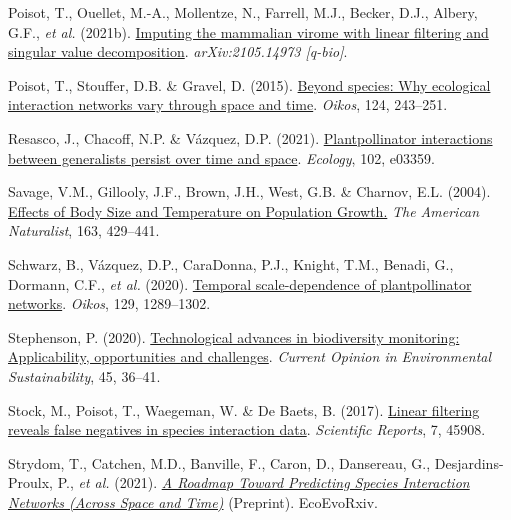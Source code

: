 \documentclass[10pt,oneside]{article}
\newlength{\cslhangindent}
\newenvironment{CSLReferences}[3] %
 {%
  \setlength{\parindent}{0pt}
  \ifodd #1 \everypar{\setlength{\hangindent}{\cslhangindent}}\ignorespaces\fi
  \ifnum #2 > 0
  \setlength{\parskip}{#2\baselineskip}
  \fi
 }%
 {}
\begin{document}
\begin{CSLReferences}{1}{0}
\leavevmode{}%
Poisot, T., Ouellet, M.-A., Mollentze, N., Farrell, M.J., Becker, D.J.,
Albery, G.F., \emph{et al.} (2021b).
\href{https://arxiv.org/abs/2105.14973}{Imputing the mammalian virome
with linear filtering and singular value decomposition}.
\emph{arXiv:2105.14973 {[}q-bio{]}}.

\leavevmode{}%
Poisot, T., Stouffer, D.B. \& Gravel, D. (2015).
\href{https://doi.org/10.1111/oik.01719}{Beyond species: Why ecological
interaction networks vary through space and time}. \emph{Oikos}, 124,
243--251.

\leavevmode{}%
Resasco, J., Chacoff, N.P. \& Vázquez, D.P. (2021).
\href{https://doi.org/10.1002/ecy.3359}{Plantpollinator interactions
between generalists persist over time and space}. \emph{Ecology}, 102,
e03359.

\leavevmode{}%
Savage, V.M., Gillooly, J.F., Brown, J.H., West, G.B. \& Charnov, E.L.
(2004). \href{https://doi.org/10.1086/381872}{Effects of Body Size and
Temperature on Population Growth.} \emph{The American Naturalist}, 163,
429--441.

\leavevmode{}%
Schwarz, B., Vázquez, D.P., CaraDonna, P.J., Knight, T.M., Benadi, G.,
Dormann, C.F., \emph{et al.} (2020).
\href{https://doi.org/10.1111/oik.07303}{Temporal scale-dependence of
plantpollinator networks}. \emph{Oikos}, 129, 1289--1302.

\leavevmode{}%
Stephenson, P. (2020).
\href{https://doi.org/10.1016/j.cosust.2020.08.005}{Technological
advances in biodiversity monitoring: Applicability, opportunities and
challenges}. \emph{Current Opinion in Environmental Sustainability}, 45,
36--41.

\leavevmode{}%
Stock, M., Poisot, T., Waegeman, W. \& De Baets, B. (2017).
\href{https://doi.org/10.1038/srep45908}{Linear filtering reveals false
negatives in species interaction data}. \emph{Scientific Reports}, 7,
45908.

\leavevmode{}%
Strydom, T., Catchen, M.D., Banville, F., Caron, D., Dansereau, G.,
Desjardins-Proulx, P., \emph{et al.} (2021).
\emph{\href{https://doi.org/10.32942/osf.io/eu7k3}{A Roadmap Toward
Predicting Species Interaction Networks (Across Space and Time)}}
(Preprint). EcoEvoRxiv.


\end{CSLReferences}
\end{document}
